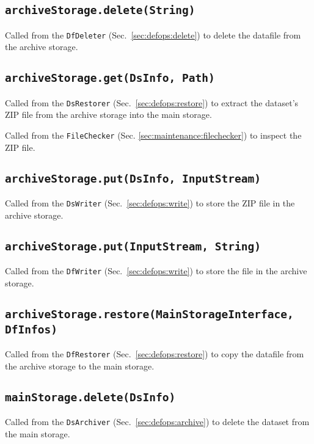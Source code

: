 \documentclass[paper=a4]{scrartcl}
\begin{document}
\subsection{\texttt{archiveStorage.delete(String)}}

Called from the \texttt{DfDeleter} (Sec.\ \ref{sec:defops:delete}) to
delete the datafile from the archive storage.

\subsection{\texttt{archiveStorage.get(DsInfo, Path)}}

Called from the \texttt{DsRestorer} (Sec.\ \ref{sec:defops:restore})
to extract the dataset's ZIP file from the archive storage into the
main storage.

Called from the \texttt{FileChecker}
(Sec. \ref{sec:maintenance:filechecker}) to inspect the ZIP file.

\subsection{\texttt{archiveStorage.put(DsInfo, InputStream)}}

Called from the \texttt{DsWriter} (Sec.\ \ref{sec:defops:write}) to
store the ZIP file in the archive storage.

\subsection{\texttt{archiveStorage.put(InputStream, String)}}

Called from the \texttt{DfWriter} (Sec.\ \ref{sec:defops:write}) to
store the file in the archive storage.

\subsection{\texttt{archiveStorage.restore(MainStorageInterface, DfInfos)}}

Called from the \texttt{DfRestorer} (Sec.\ \ref{sec:defops:restore})
to copy the datafile from the archive storage to the main storage.

\subsection{\texttt{mainStorage.delete(DsInfo)}}

Called from the \texttt{DsArchiver} (Sec.\ \ref{sec:defops:archive})
to delete the dataset from the main storage.
\end{document}
